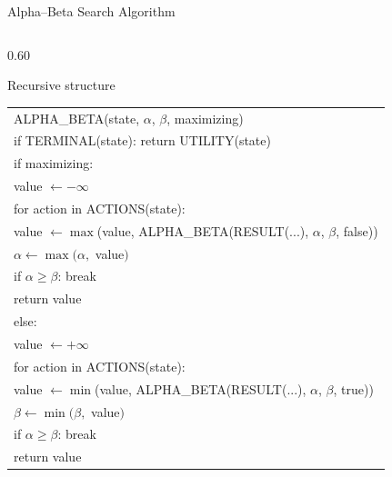 \documentclass[aspectratio=169,10pt]{beamer}
\begin{document}



\begin{frame}[shrink=18]{Alpha--Beta Search Algorithm}

  \begin{columns}[T,onlytextwidth]

    \begin{column}{0.60\textwidth}

      \begin{block}{Recursive structure}

      {\ttfamily\scriptsize
      \begin{tabular}{@{}l@{}}
      ALPHA\_BETA(state, $\alpha$, $\beta$, maximizing)\\[0.02in]
      \quad if TERMINAL(state): return UTILITY(state)\\[0.04in]
      \quad if maximizing:\\
      \qquad value $\leftarrow -\infty$\\
      \qquad for action in ACTIONS(state):\\
      \qquad\quad value $\leftarrow \max$(value, ALPHA\_BETA(RESULT(...), $\alpha$, $\beta$, false))\\
      \qquad\quad $\alpha \leftarrow \max(\alpha,$ value$)$\\
      \qquad\quad if $\alpha \ge \beta$: break\\
      \qquad return value\\[0.04in]
      \quad else:\\
      \qquad value $\leftarrow +\infty$\\
      \qquad for action in ACTIONS(state):\\
      \qquad\quad value $\leftarrow \min$(value, ALPHA\_BETA(RESULT(...), $\alpha$, $\beta$, true))\\
      \qquad\quad $\beta \leftarrow \min(\beta,$ value$)$\\
      \qquad\quad if $\alpha \ge \beta$: break\\
      \qquad return value
      \end{tabular}}

      \end{block}

    \end{column}


\end{columns}
\end{frame}
\end{document}
